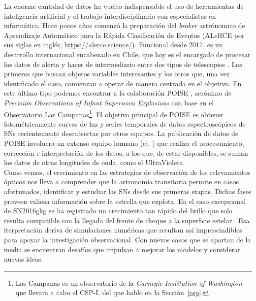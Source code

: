 \documentclass[baaa]{baaa}
\begin{document}
La enorme cantidad de datos ha vuelto indispensable el uso de herramientas de inteligencia artificial y el trabajo interdisciplinario con especialistas en informática. Hace pocos años comenzó la preparación del {\em broker} astrónomico de Aprendizaje Automático para la Rápida Clasificación de Eventos (ALeRCE por sus siglas en inglés, \url{https://alerce.science/}). Funcional desde 2017, es un desarrollo internacional encabezado en Chile, que hoy es el encargado de procesar los datos de alerta y hacer de intermediario entre dos tipos de telescopios \citep{2021Foster}. Los primeros que buscan objetos variables interesantes y los otros que, una vez identificado el caso, comienzan a operar de manera centrada en el objetivo. En este último tipo podemos encontrar a la colaboración POISE \cite{2021Burns}, acrónimo de {\em Precision Observations of Infant Supernova Explosions} con base en el Observatorio Las Campanas\footnote{Las Campanas es un observatorio de la {\em Carnegie Institution of Washington} que llevara a cabo el CSP-I, del que hablo en la Sección~\ref{csp}.}. El objetivo principal de POISE es obtener fotométricamente curvas de luz y series temporales de datos espectroscópicos de SNs recientemente descubiertas por otros equipos. La publicación de datos de POISE involucra un extenso equipo humano (ej. \citealt{2023Ertini}) que realiza el procesamiento, corrección e interpretación de los datos, a los que, de estar disponibles, se suman los datos de otras longitudes de onda, como el UltraVioleta.\\

Como vemos, el crecimiento en las estrategias de observación de los relevamientos ópticos nos lleva a comprender que la astronomía transitoria permite en casos afortunados, identificar y estudiar las SNs desde sus primeras etapas. Dichas fases proveen valiosa información sobre la estrella que explota.
En el caso excepcional de SN2016gkg se ha registrado un crecimiento tan rápido del brillo que solo resulta compatible con la llegada del frente de choque a la superficie estelar \citep{2018Bersten}. Esa iterpretación deriva de simulaciones numéricas que resultan así imprescindibles para apoyar la investigación observacional. 
Con nuevos casos que se apartan de la media se encuentran desafíos que impulsan a mejorar los modelos y considerar nuevas ideas. %
\end{document}
